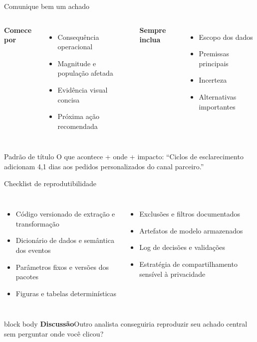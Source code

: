 \documentclass[aspectratio=169,11pt]{beamer}
\newcommand{\promptbox}[1]{%
  \begin{beamercolorbox}[rounded=true,sep=0.65em]{block body}
    \textbf{\color{Coral}Discussão}\quad #1
  \end{beamercolorbox}
}
\begin{document}
\begin{frame}{Comunique bem um achado}
  \begin{columns}[T,onlytextwidth]
      \textbf{Comece por}
      \begin{itemize}
        \item Consequência operacional
        \item Magnitude e população afetada
        \item Evidência visual concisa
        \item Próxima ação recomendada
      \end{itemize}
      \textbf{Sempre inclua}
      \begin{itemize}
        \item Escopo dos dados
        \item Premissas principais
        \item Incerteza
        \item Alternativas importantes
      \end{itemize}
  \end{columns}
  \vspace{0.45cm}
  \begin{block}{Padrão de título}
    \alert{O que acontece} + \alert{onde} + \alert{impacto}: ``Ciclos de esclarecimento adicionam 4,1 dias aos pedidos personalizados do canal parceiro.''
  \end{block}
\end{frame}

\begin{frame}{Checklist de reprodutibilidade}
  \begin{columns}[T,onlytextwidth]
      \begin{itemize}
        \item Código versionado de extração e transformação
        \item Dicionário de dados e semântica dos eventos
        \item Parâmetros fixos e versões dos pacotes
        \item Figuras e tabelas determinísticas
      \end{itemize}
      \begin{itemize}
        \item Exclusões e filtros documentados
        \item Artefatos de modelo armazenados
        \item Log de decisões e validações
        \item Estratégia de compartilhamento sensível à privacidade
      \end{itemize}
  \end{columns}
  \vspace{0.5cm}
  \promptbox{Outro analista conseguiria reproduzir seu achado central sem perguntar onde você clicou?}
\end{frame}
\end{document}
